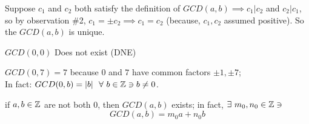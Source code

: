 \begin{proposition}
Suppose $c_1$ and $c_2$ both satisfy the definition of $GCD(a,b) \implies c_1|c_2$ and $c_2|c_1$, so by observation \#2, $c_1=\pm c_2 \implies c_1=c_2$ (because, $c_1,c_2$ assumed positive). So the $GCD(a,b)$ is unique.
\end{proposition}
\begin{example}
$GCD(0,0)$ Does not exist (DNE)
\end{example}
\begin{example}
$GCD(0,7)=7$ because $0$ and $7$ have common factors $\pm 1,\pm 7$; \\
In fact: $GCD(0, b)=|b| \ \ \forall \ b\in {\mathbb{ Z}}\ni b\neq 0$.
\end{example}


\begin{lemma} 
if $a,b\in {\mathbb{ Z}}$ are not both $0$, then $GCD(a,b)$ exists; in fact, $\exists \ m_0,n_0\in {\mathbb{ Z}} \ni $
\begin{equation}
    GCD(a,b)=m_0 a+n_0 b\nonumber
\end{equation}


\end{lemma}
